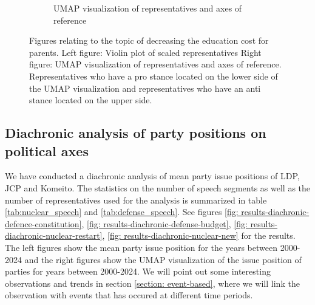 \documentclass[final,5p,times,twocolumn,authoryear]{elsarticle}
\begin{document}
\begin{figure}[h]
\begin{subfigure}{0.22\textwidth}
      \caption{UMAP visualization of representatives and axes of reference}
    \end{subfigure}
\caption{Figures relating to the topic of decreasing the education cost for parents. Left figure: Violin plot of scaled representatives Right figure: UMAP visualization of representatives and axes of reference. Representatives who have a pro stance located on the lower side of the UMAP visualization and representatives who have an anti stance located on the upper side.}
\label{fig: results-aging-education-cost}
\end{figure}


\FloatBarrier

\subsection{Diachronic analysis of party positions on political axes}
\label{section: diachronic}
We have conducted a diachronic analysis of mean party issue positions of LDP, JCP and Komeito. The statistics on the number of speech segments as well as the number of representatives used for the analysis is summarized in table \ref{tab:nuclear_speech} and \ref{tab:defense_speech}. See figures \ref{fig: results-diachronic-defence-constitution}, \ref{fig: results-diachronic-defense-budget}, \ref{fig: results-diachronic-nuclear-restart}, \ref{fig: results-diachronic-nuclear-new} for the results. The left figures show the mean party issue position for the years between 2000-2024 and the right figures show the UMAP visualization of the issue position of parties for years between 2000-2024. We will point out some interesting observations and trends in section \ref{section: event-based}, where we will link the observation with events that has occured at different time periods. 

\onecolumn
\end{document}
